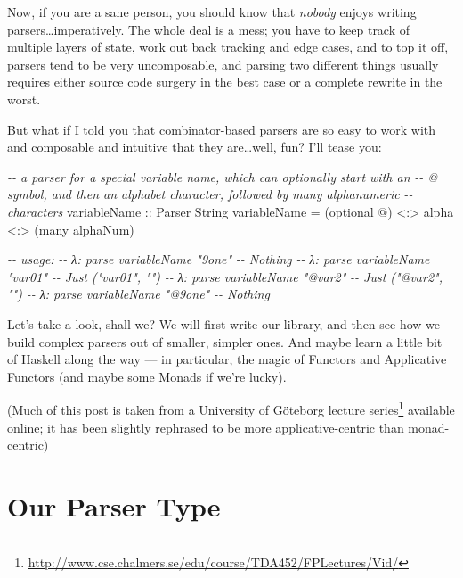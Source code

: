\documentclass[]{article}
\newenvironment{Shaded}{}{}
\newcommand{\CharTok}[1]{\textcolor[rgb]{0.25,0.44,0.63}{#1}}
\newcommand{\CommentTok}[1]{\textcolor[rgb]{0.38,0.63,0.69}{\textit{#1}}}
\newcommand{\DataTypeTok}[1]{\textcolor[rgb]{0.56,0.13,0.00}{#1}}
\newcommand{\NormalTok}[1]{#1}
\newcommand{\OperatorTok}[1]{\textcolor[rgb]{0.40,0.40,0.40}{#1}}
\newcommand{\OtherTok}[1]{\textcolor[rgb]{0.00,0.44,0.13}{#1}}
\renewcommand{\href}[2]{#2\footnote{\url{#1}}}
\begin{document}
Now, if you are a sane person, you should know that \emph{nobody} enjoys writing
parsers\ldots imperatively. The whole deal is a mess; you have to keep track of
multiple layers of state, work out back tracking and edge cases, and to top it
off, parsers tend to be very uncomposable, and parsing two different things
usually requires either source code surgery in the best case or a complete
rewrite in the worst.

But what if I told you that combinator-based parsers are so easy to work with
and composable and intuitive that they are\ldots well, fun? I'll tease you:

\begin{Shaded}
\begin{Highlighting}[]
\CommentTok{{-}{-} a parser for a special variable name, which can optionally start with an}
\CommentTok{{-}{-} \textasciigrave{}@\textasciigrave{} symbol, and then an alphabet character, followed by many alphanumeric}
\CommentTok{{-}{-} characters}
\OtherTok{variableName ::} \DataTypeTok{Parser} \DataTypeTok{String}
\NormalTok{variableName }\OtherTok{=}\NormalTok{ (optional }\CharTok{\textquotesingle{}@\textquotesingle{}}\NormalTok{) }\OperatorTok{\textless{}:\textgreater{}}\NormalTok{ alpha }\OperatorTok{\textless{}:\textgreater{}}\NormalTok{ (many alphaNum)}

\CommentTok{{-}{-} usage:}
\CommentTok{{-}{-} λ: parse variableName "9one"}
\CommentTok{{-}{-} Nothing}
\CommentTok{{-}{-} λ: parse variableName "var01"}
\CommentTok{{-}{-} Just ("var01", "")}
\CommentTok{{-}{-} λ: parse variableName "@var2"}
\CommentTok{{-}{-} Just ("@var2", "")}
\CommentTok{{-}{-} λ: parse variableName "@9one"}
\CommentTok{{-}{-} Nothing}
\end{Highlighting}
\end{Shaded}

Let's take a look, shall we? We will first write our library, and then see how
we build complex parsers out of smaller, simpler ones. And maybe learn a little
bit of Haskell along the way --- in particular, the magic of Functors and
Applicative Functors (and maybe some Monads if we're lucky).

(Much of this post is taken from a University of Göteborg
\href{http://www.cse.chalmers.se/edu/course/TDA452/FPLectures/Vid/}{lecture
series} available online; it has been slightly rephrased to be more
applicative-centric than monad-centric)

\section{Our Parser Type}\label{our-parser-type}
\end{document}
